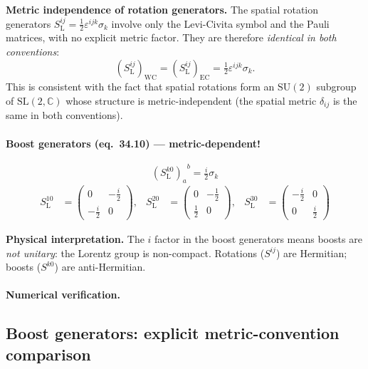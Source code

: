 \noindent\textbf{Metric independence of rotation generators.}
The spatial rotation generators $S^{ij}_{\mathrm{L}} = \tfrac{1}{2}\varepsilon^{ijk}\sigma_k$
involve only the Levi-Civita symbol and the Pauli matrices, with no explicit
metric factor. They are therefore \emph{identical in both conventions}:
\[
  (S^{ij}_{\mathrm{L}})_{\mathrm{WC}} = (S^{ij}_{\mathrm{L}})_{\mathrm{EC}}
  = \tfrac{1}{2}\varepsilon^{ijk}\sigma_k.
\]
This is consistent with the fact that spatial rotations form an $\mathrm{SU}(2)$
subgroup of $\mathrm{SL}(2,\mathbb{C})$ whose structure is
metric-independent (the spatial metric $\delta_{ij}$ is the same in both conventions).

\paragraph{Boost generators (eq.~34.10) --- metric-dependent!}
\begin{equation}
  {(S^{k0}_{\mathrm{L}})_a}^b = \tfrac{i}{2}\sigma_k
  \tag{34.10}
\end{equation}
\begin{align*}
  S^{10}_{\mathrm{L}} &= \begin{pmatrix}0 & -\tfrac{i}{2} \\ -\tfrac{i}{2} & 0\end{pmatrix},&
  S^{20}_{\mathrm{L}} &= \begin{pmatrix}0 & -\tfrac{1}{2} \\ \tfrac{1}{2} & 0\end{pmatrix},&
  S^{30}_{\mathrm{L}} &= \begin{pmatrix}-\tfrac{i}{2} & 0 \\ 0 & \tfrac{i}{2}\end{pmatrix}
\end{align*}

\noindent\textbf{Physical interpretation.}
The $i$ factor in the boost generators means boosts are \emph{not unitary}:
the Lorentz group is non-compact.  Rotations ($S^{ij}$) are Hermitian;
boosts ($S^{k0}$) are anti-Hermitian.

\paragraph{Numerical verification.}

\subsection{Boost generators: explicit metric-convention comparison}

